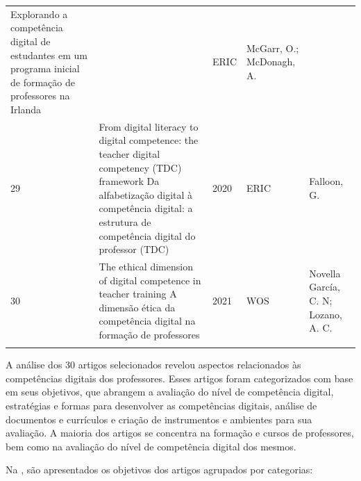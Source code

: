 \documentclass[portuguese]{textolivre}
\begin{document}
\begin{small}
\begin{longtable}{
    @{}l >{\raggedright\arraybackslash}p{}
    @{}ll
    >{\raggedright\arraybackslash}p{}@{}
    }
Explorando a competência digital de estudantes em um programa inicial de formação de professores na Irlanda & 2021 & ERIC & McGarr, O.; McDonagh, A. \\
29 & From digital literacy to digital competence: the teacher digital competency (TDC) framework \newline
Da alfabetização digital à competência digital: a estrutura de competência digital do professor (TDC) & 2020 & ERIC & Falloon, G. \\
30 & The ethical dimension of digital competence in teacher training \newline
A dimensão ética da competência digital na formação de professores & 2021 & WOS & Novella García, C. N; Lozano, A. C. \\
\bottomrule
\source{\textcite{silva2022}.}
\end{longtable}
\end{small}

A análise dos 30 artigos selecionados revelou aspectos relacionados às
competências digitais dos professores. Esses artigos foram categorizados
com base em seus objetivos, que abrangem a avaliação do nível de
competência digital, estratégias e formas para desenvolver as
competências digitais, análise de documentos e currículos e criação de
instrumentos e ambientes para sua avaliação. A maioria dos artigos se
concentra na formação e cursos de professores, bem como na avaliação do
nível de competência digital dos mesmos.

Na , são apresentados os objetivos dos artigos agrupados por
categorias:
\end{document}

